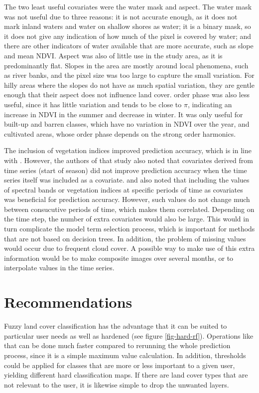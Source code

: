 \documentclass[a4paper,12pt]{scrbook}
\begin{document}
The two least useful covariates were the water mask and aspect. The water mask was not useful due to three reasons: it is not accurate enough, as it does not mark inland waters and water on shallow shores as water; it is a binary mask, so it does not give any indication of how much of the pixel is covered by water; and there are other indicators of water available that are more accurate, such as slope and mean NDVI. Aspect was also of little use in the study area, as it is predominantly flat. Slopes in the area are mostly around local phenomena, such as river banks, and the pixel size was too large to capture the small variation. For hilly areas where the slopes do not have as much spatial variation, they are gentle enough that their aspect does not influence land cover.  order phase was also less useful, since it has little variation and tends to be close to $\pi{}$, indicating an increase in NDVI in the summer and decrease in winter. It was only useful for built-up and barren classes, which have no variation in NDVI over the year, and cultivated areas, whose  order phase depends on the strong  order harmonics.

The inclusion of vegetation indices improved prediction accuracy, which is in line with \citet{Pelletier2016hardrf}. However, the authors of that study also noted that covariates derived from time series (start of season) did not improve prediction accuracy when the time series itself was included as a covariate. \citet{davranche2010wetland} and \citet{dong2014lswi} also noted that including the values of spectral bands or vegetation indices at specific periods of time as covariates was beneficial for prediction accuracy. However, such values do not change much between consucutive periods of time, which makes them correlated. Depending on the time step, the number of extra covariates would also be large. This would in turn complicate the model term selection process, which is important for methods that are not based on decision trees. In addition, the problem of missing values would occur due to frequent cloud cover. A possible way to make use of this extra information would be to make composite images over several months, or to interpolate values in the time series.

\section{Recommendations}

Fuzzy land cover classification has the advantage that it can be suited to particular user needs as well as hardened (see figure \ref{fig-hard-rf}). Operations like that can be done much faster compared to rerunning the whole prediction process, since it is a simple maximum value calculation. In addition, thresholds could be applied for classes that are more or less important to a given user, yielding different hard classification maps. If there are land cover types that are not relevant to the user, it is likewise simple to drop the unwanted layers.
\end{document}
